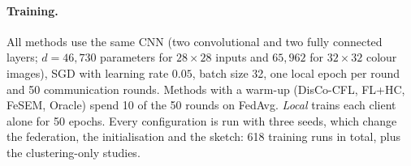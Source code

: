 \begin{table}[!htbp]
\centering
\caption{Scenarios. $N$: clients; groups: number of concept groups; QS: quantity skew; part.: fraction of clients per round.}\label{tab:scenarios}
\small
{}
\end{table}

\paragraph{Training.} All methods use the same CNN (two convolutional and two fully connected layers; $d=46{,}730$ parameters for $28\times28$ inputs and $65{,}962$ for $32\times32$ colour images), SGD with learning rate $0.05$, batch size 32, one local epoch per round and 50 communication rounds. Methods with a warm-up (DisCo-CFL, FL+HC, FeSEM, Oracle) spend 10 of the 50 rounds on FedAvg. \emph{Local} trains each client alone for 50 epochs. Every configuration is run with three seeds, which change the federation, the initialisation and the sketch: 618 training runs in total, plus the clustering-only studies.

